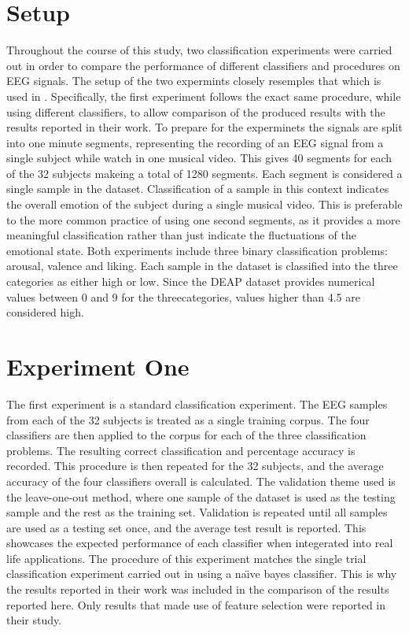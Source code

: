 \documentclass[12pt, a4paper, fleqn]{memoir}%
\begin{document}
\section{Setup}
\label{sec:setup}
Throughout the course of this study, two classification experiments were carried out in order to compare the performance of different classifiers and procedures on EEG signals. The setup of the two expermints closely resemples that which is used in \cite{koelstra2012deap}. Specifically, the first experiment follows the exact same procedure, while using different classifiers, to allow comparison of the produced results with the results reported in their work. To prepare for the experminets the signals are split into one minute segments, representing the recording of an EEG signal from a single subject while watch in one musical video. This gives 40 segments for each of the 32 subjects makeing a total of 1280 segments. Each segment is considered a single sample in the dataset. Classification of a sample in this context indicates the overall emotion of the subject during a single musical video. This is preferable to the more common practice of using one second segments, as it provides a more meaningful classification rather than just indicate the fluctuations of the  emotional state. Both experiments include three binary classification problems: arousal, valence and liking. Each sample in the dataset is classified into the three categories as either high or low. Since the DEAP dataset provides numerical values between 0 and 9 for the threecategories, values higher than 4.5 are considered high.

\section{Experiment One}
\label{sec:exp1}
The first experiment is a standard classification experiment. The EEG samples from each of the 32 subjects is treated as a single training corpus. The four classifiers are then applied to the corpus for each of the three classification problems. The resulting correct classification and percentage accuracy is recorded. This procedure is then repeated for the 32 subjects, and the average accuracy of the four classifiers overall is calculated. The validation theme used is the leave-one-out method, where one sample of the dataset is used as the testing sample and the rest as the training set. Validation is repeated until all samples are used as a testing set once, and the average test result is reported. This showcases the expected performance of each classifier when integerated into real life applications. The procedure of this experiment matches the single trial classification experiment carried out in \cite{koelstra2012deap} using a na\"{\i}ve bayes classifier. This is why the results reported in their work was included in the comparison of the results reported here. Only results that made use of feature selection were reported in their study.
\end{document}
